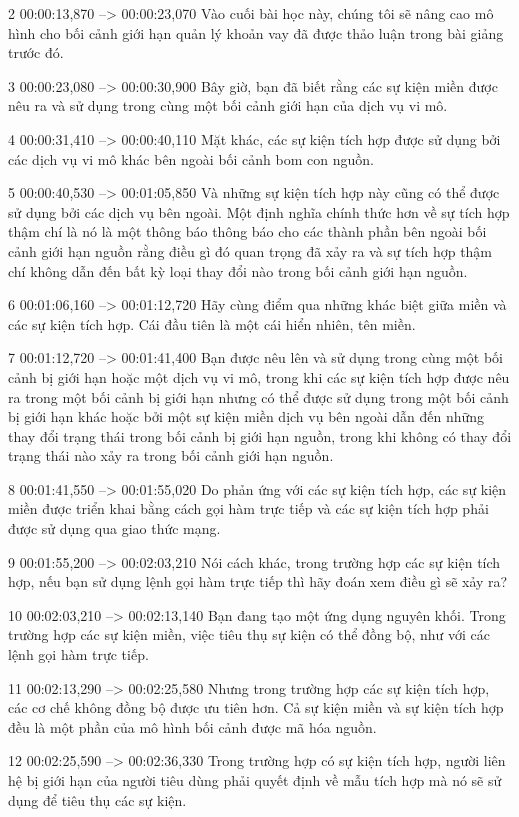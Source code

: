 2
00:00:13,870 --> 00:00:23,070
Vào cuối bài học này, chúng tôi sẽ nâng cao mô hình cho bối cảnh giới hạn quản lý khoản vay đã được thảo luận trong bài giảng trước đó.

3
00:00:23,080 --> 00:00:30,900
Bây giờ, bạn đã biết rằng các sự kiện miền được nêu ra và sử dụng trong cùng một bối cảnh giới hạn của dịch vụ vi mô.

4
00:00:31,410 --> 00:00:40,110
Mặt khác, các sự kiện tích hợp được sử dụng bởi các dịch vụ vi mô khác bên ngoài bối cảnh bom con nguồn.

5
00:00:40,530 --> 00:01:05,850
Và những sự kiện tích hợp này cũng có thể được sử dụng bởi các dịch vụ bên ngoài.  Một định nghĩa chính thức hơn về sự tích hợp thậm chí là nó là một thông báo thông báo cho các thành phần bên ngoài bối cảnh giới hạn nguồn rằng điều gì đó quan trọng đã xảy ra và sự tích hợp thậm chí không dẫn đến bất kỳ loại thay đổi nào trong bối cảnh giới hạn nguồn.

6
00:01:06,160 --> 00:01:12,720
Hãy cùng điểm qua những khác biệt giữa miền và các sự kiện tích hợp.  Cái đầu tiên là một cái hiển nhiên, tên miền.

7
00:01:12,720 --> 00:01:41,400
Bạn được nêu lên và sử dụng trong cùng một bối cảnh bị giới hạn hoặc một dịch vụ vi mô, trong khi các sự kiện tích hợp được nêu ra trong một bối cảnh bị giới hạn nhưng có thể được sử dụng trong một bối cảnh bị giới hạn khác hoặc bởi một sự kiện miền dịch vụ bên ngoài dẫn đến những thay đổi trạng thái trong bối cảnh bị giới hạn nguồn,  trong khi không có thay đổi trạng thái nào xảy ra trong bối cảnh giới hạn nguồn.

8
00:01:41,550 --> 00:01:55,020
Do phản ứng với các sự kiện tích hợp, các sự kiện miền được triển khai bằng cách gọi hàm trực tiếp và các sự kiện tích hợp phải được sử dụng qua giao thức mạng.

9
00:01:55,200 --> 00:02:03,210
Nói cách khác, trong trường hợp các sự kiện tích hợp, nếu bạn sử dụng lệnh gọi hàm trực tiếp thì hãy đoán xem điều gì sẽ xảy ra?

10
00:02:03,210 --> 00:02:13,140
Bạn đang tạo một ứng dụng nguyên khối.  Trong trường hợp các sự kiện miền, việc tiêu thụ sự kiện có thể đồng bộ, như với các lệnh gọi hàm trực tiếp.

11
00:02:13,290 --> 00:02:25,580
Nhưng trong trường hợp các sự kiện tích hợp, các cơ chế không đồng bộ được ưu tiên hơn.  Cả sự kiện miền và sự kiện tích hợp đều là một phần của mô hình bối cảnh được mã hóa nguồn.

12
00:02:25,590 --> 00:02:36,330
Trong trường hợp có sự kiện tích hợp, người liên hệ bị giới hạn của người tiêu dùng phải quyết định về mẫu tích hợp mà nó sẽ sử dụng để tiêu thụ các sự kiện.


